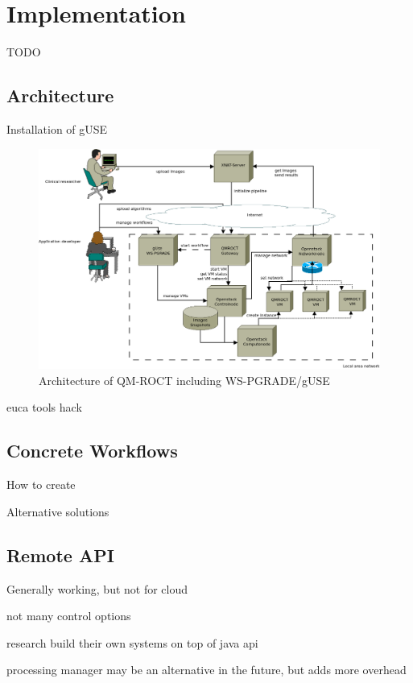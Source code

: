 \section{Implementation}\label{implementation}

TODO

\subsection{Architecture}\label{architecture}

Installation of gUSE

\begin{figure}%
                \centering
                \includegraphics[width=2.0\columnwidth]{images/somno-architecture.png}
                \caption{Architecture of QM-ROCT \cite{wu14} including WS-PGRADE/gUSE}
                \label{fig:architecture}
\end{figure}

euca tools hack

\subsection{Concrete Workflows}\label{concrete}

How to create

Alternative solutions

\subsection{Remote API}\label{api}

Generally working, but not for cloud

not many control options

research build their own systems on top of java api

processing manager may be an alternative in the future, but adds more overhead